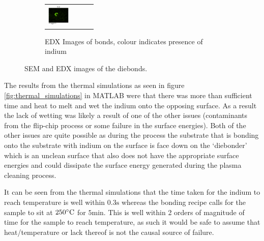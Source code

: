 \begin{figure}[h]
\begin{subfigure}[t]{0.4\textwidth}
\begin{tabular}{c c c c}
    \includegraphics[height=1cm]{Main/Ch2/extracted/Indium/In-EP-EDx_TLED-02-B2-s2_media_image7.png} \\
    \end{tabular}
    \caption{EDX Images of bonds, colour indicates presence of indium}
    \label{fig:EDX_indium_2}
\end{subfigure}
\caption{SEM and EDX images of the diebonds.}
\end{figure}


The results from the thermal simulations as seen in figure \ref{fig:thermal_simulations} in MATLAB were that there was more than sufficient time and heat to melt and wet the indium onto the opposing surface. As a result the lack of wetting was likely a result of one of the other issues (contaminants from the flip-chip process or some failure in the surface energies).
Both of the other issues are quite possible as during the process the substrate that is bonding onto the substrate with indium on the surface is face down on the `diebonder' which is an unclean surface that also does not have the appropriate surface energies and could dissipate the surface energy generated during the plasma cleaning process.

It can be seen from the thermal simulations that the time taken for the indium to reach temperature is well within $0.3 \unit{\second}$ whereas the bonding recipe calls for the sample to sit at $250 \dC$ for $5 \unit{\minute}$. This is well within 2 orders of magnitude of time for the sample to reach temperature, as such it would be safe to assume that heat/temperature or lack thereof is not the causal source of failure.


